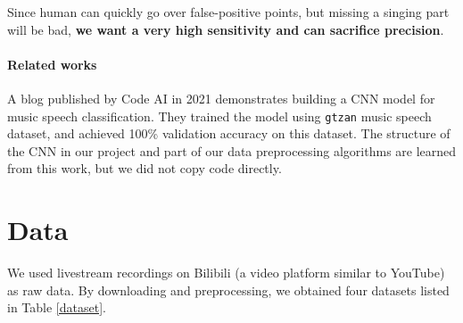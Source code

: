 \documentclass{article}
\begin{document}
    Since human can quickly go over false-positive points, but missing a singing part will be bad, \textbf{we want a very high sensitivity and can sacrifice precision}.

    \paragraph*{Related works}
    A blog published by Code AI in 2021 \cite{codeai} demonstrates building a CNN model for music speech classification. They trained the model using \lstinline|gtzan| music speech dataset, and achieved 100\% validation accuracy on this dataset. The structure of the CNN in our project and part of our data preprocessing algorithms are learned from this work, but we did not copy code directly.


    \section{Data}

    We used livestream recordings on Bilibili (a video platform similar to YouTube) as raw data. By downloading and preprocessing, we obtained four datasets listed in Table \ref{dataset}.
\end{document}
